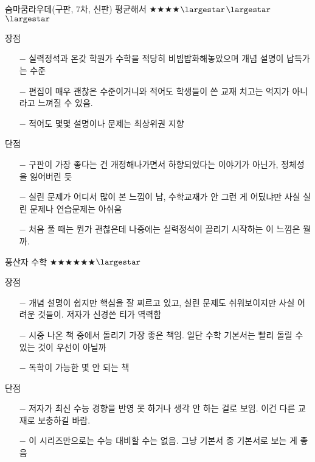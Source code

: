 숨마쿰라우데(구판, 7차, 신판) 평균해서 $\bigstar$$\bigstar$$\bigstar$$\bigstar$$\largestar$$\largestar$$\largestar$
\vspace{5mm}

장점
\begin{itemize}
    \item[$-$] 실력정석과 온갖 학원가 수학을 적당히 비빔밥화해놓았으며 개념 설명이 납득가는 수준
    \item[$-$] 편집이 매우 괜찮은 수준이거니와 적어도 학생들이 쓴 교재 치고는 억지가 아니라고 느껴질 수 있음.
    \item[$-$] 적어도 몇몇 설명이나 문제는 최상위권 지향
\end{itemize}
\vspace{5mm}

단점
\begin{itemize}
    \item[$-$] 구판이 가장 좋다는 건 개정해나가면서 하향되었다는 이야기가 아닌가, 정체성을 잃어버린 듯
    \item[$-$] 실린 문제가 어디서 많이 본 느낌이 남, 수학교재가 안 그런 게 어딨냐만 사실 실린 문제나 연습문제는 아쉬움
    \item[$-$] 처음 풀 때는 뭔가 괜찮은데 나중에는 실력정석이 끌리기 시작하는 이 느낌은 뭘까.
\end{itemize}
\vspace{5mm}

풍산자 수학 $\bigstar$$\bigstar$$\bigstar$$\bigstar$$\bigstar$$\bigstar$$\largestar$
\vspace{5mm}

장점
\begin{itemize}
    \item[$-$] 개념 설명이 쉽지만 핵심을 잘 찌르고 있고, 실린 문제도 쉬워보이지만 사실 어려운 것들이. 저자가 신경쓴 티가 역력함
    \item[$-$] 시중 나온 책 중에서 돌리기 가장 좋은 책임. 일단 수학 기본서는 빨리 돌릴 수 있는 것이 우선이 아닐까
    \item[$-$] 독학이 가능한 몇 안 되는 책
\end{itemize}

\vspace{5mm}

단점
\begin{itemize}
    \item[$-$] 저자가 최신 수능 경향을 반영 못 하거나 생각 안 하는 걸로 보임. 이건 다른 교재로 보충하길 바람.
    \item[$-$] 이 시리즈만으로는 수능 대비할 수는 없음. 그냥 기본서 중 기본서로 보는 게 좋음
\end{itemize}
\vspace{5mm}

